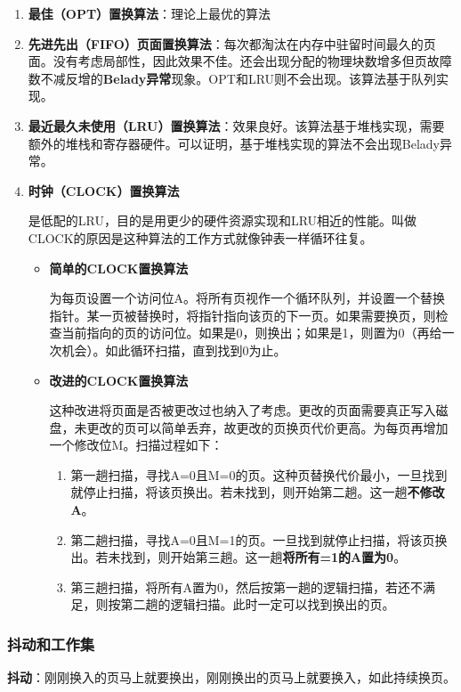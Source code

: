 \documentclass[12pt, a4paper, oneside]{ctexart}
\begin{document}
\begin{enumerate}
  \item {\bf 最佳（OPT）置换算法}：理论上最优的算法
  \item {\bf 先进先出（FIFO）页面置换算法}：每次都淘汰在内存中驻留时间最久的页面。没有考虑局部性，因此效果不佳。还会出现分配的物理块数增多但页故障数不减反增的\textbf{Belady异常}现象。OPT和LRU则不会出现。该算法基于队列实现。
  \item {\bf 最近最久未使用（LRU）置换算法}：效果良好。该算法基于堆栈实现，需要额外的堆栈和寄存器硬件。可以证明，基于堆栈实现的算法不会出现Belady异常。
  \item {\bf 时钟（CLOCK）置换算法}
  
  是低配的LRU，目的是用更少的硬件资源实现和LRU相近的性能。叫做CLOCK的原因是这种算法的工作方式就像钟表一样循环往复。
  \begin{itemize}
    \item {\bf 简单的CLOCK置换算法}
    
    为每页设置一个访问位A。将所有页视作一个循环队列，并设置一个替换指针。某一页被替换时，将指针指向该页的下一页。如果需要换页，则检查当前指向的页的访问位。如果是0，则换出；如果是1，则置为0（再给一次机会）。如此循环扫描，直到找到0为止。
    \item {\bf 改进的CLOCK置换算法}
    
    这种改进将页面是否被更改过也纳入了考虑。更改的页面需要真正写入磁盘，未更改的页可以简单丢弃，故更改的页换页代价更高。为每页再增加一个修改位M。扫描过程如下：
    \begin{enumerate}
      \item 第一趟扫描，寻找A=0且M=0的页。这种页替换代价最小，一旦找到就停止扫描，将该页换出。若未找到，则开始第二趟。这一趟\textbf{不修改A}。
      \item 第二趟扫描，寻找A=0且M=1的页。一旦找到就停止扫描，将该页换出。若未找到，则开始第三趟。这一趟\textbf{将所有=1的A置为0}。
      \item 第三趟扫描，将所有A置为0，然后按第一趟的逻辑扫描，若还不满足，则按第二趟的逻辑扫描。此时一定可以找到换出的页。
    \end{enumerate}
  \end{itemize}
\end{enumerate}

\subsubsection{抖动和工作集}

\textbf{抖动}：刚刚换入的页马上就要换出，刚刚换出的页马上就要换入，如此持续换页。
\end{document}
